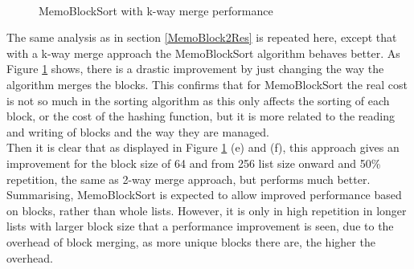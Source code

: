 \documentclass[a4paper,12pt]{article}
\begin{document}
\begin{figure}[H]
\\ %
%
\hfill %
%
\caption{MemoBlockSort with k-way merge performance}
\label{fig:MemoBlockSortKWayGraph}
\end{figure}

The same analysis as in section \ref{MemoBlock2Res} is repeated here, except that with a k-way merge approach the MemoBlockSort algorithm behaves better. As Figure \ref{fig:MemoBlockSortKWayGraph} shows, there is a drastic improvement by just changing the way the algorithm merges the blocks. 
This confirms that for MemoBlockSort the real cost is not so much in the sorting algorithm as this only affects the sorting of each block, or the cost of the hashing function, but it  is more related to the reading and writing of blocks and the way they are managed.\\

Then it is clear that as displayed in Figure \ref{fig:MemoBlockSortKWayGraph} (e) and (f), this approach gives an improvement for the block size of 64 and from 256 list size onward and 50\% repetition, the same as 2-way merge approach, but performs much better.\\

Summarising, MemoBlockSort is expected to allow improved performance based on blocks, rather than whole lists. However, it is only in high repetition in longer lists with larger block size that a performance improvement is seen, due to the overhead of block merging, as more unique blocks there are, the higher the overhead.
\end{document}
